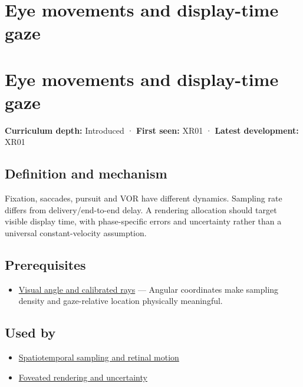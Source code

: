 \hypertarget{appendix-a6f2c4fe1996}{}
\section*{Eye movements and display-time gaze}
\section{Eye movements and display-time gaze}\label{appendix-a6f2c4fe1996-eye-movements-and-display-time-gaze}

\textbf{Curriculum depth:} Introduced · \textbf{First seen:} XR01 · \textbf{Latest development:} XR01

\subsection{Definition and mechanism}\label{appendix-a6f2c4fe1996-definition-and-mechanism}

Fixation, saccades, pursuit and VOR have different dynamics. Sampling rate differs from delivery/end-to-end delay. A rendering allocation should target visible display time, with phase-specific errors and uncertainty rather than a universal constant-velocity assumption.

\subsection{Prerequisites}\label{appendix-a6f2c4fe1996-prerequisites}

\begin{itemize}
\tightlist
\item
  \hyperref[appendix-7d356c396d1a]{Visual angle and calibrated rays} --- Angular coordinates make sampling density and gaze-relative location physically meaningful.
\end{itemize}

\subsection{Used by}\label{appendix-a6f2c4fe1996-used-by}

\begin{itemize}
\tightlist
\item
  \hyperref[appendix-70895739febb]{Spatiotemporal sampling and retinal motion}
\item
  \hyperref[appendix-5878b813b732]{Foveated rendering and uncertainty}
\end{itemize}

